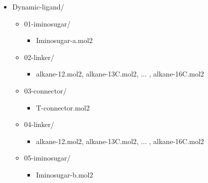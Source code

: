 \begin{itemize}
	\item Dynamic-ligand/

\begin{itemize}
	\item 01-iminosugar/

\begin{itemize}
	\item Iminosugar-a.mol2


\end{itemize}
	\item 02-linker/

\begin{itemize}
	\item alkane-12.mol2, alkane-13C.mol2, $ \ldots $ , alkane-16C.mol2


\end{itemize}
	\item 03-connector/

\begin{itemize}
	\item T-connector.mol2


\end{itemize}
	\item 04-linker/

\begin{itemize}
	\item alkane-12.mol2, alkane-13C.mol2, $ \ldots $ , alkane-16C.mol2


\end{itemize}
	\item 05-iminosugar/

\begin{itemize}
	\item Iminosugar-b.mol2
\end{itemize}
\end{itemize}
\end{itemize}





